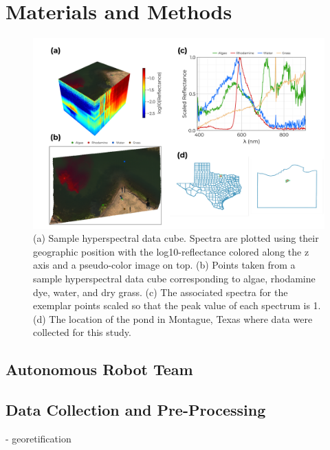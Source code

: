 \documentclass[remotesensing,article,submit,pdftex,moreauthors]{Definitions/mdpi}
\begin{document}
\section{Materials and Methods}

\begin{figure}[t]
\centering
\includegraphics[width=\columnwidth]{paper/figures/methods/sample-spectra.pdf}
\caption{(a) Sample hyperspectral data cube. Spectra are plotted using their geographic position with the log10-reflectance colored along the z axis and a pseudo-color image on top. (b) Points taken from a sample hyperspectral data cube corresponding to algae, rhodamine dye, water, and dry grass. (c) The associated spectra for the exemplar points scaled so that the peak value of each spectrum is 1. (d) The location of the pond in Montague, Texas where data were collected for this study.\label{fig:sample-spectra}}
\end{figure}  


\subsection{Autonomous Robot Team}
\subsection{Data Collection and Pre-Processing}

- georetification \cite{muller2002program, baumker2001new, mostafa2000multi}
\end{document}
